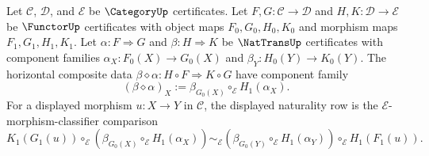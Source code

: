 \begin{definition}
\label{def:nattrans-horizontal-composition-certificate-data}
Let $\mathcal C$, $\mathcal D$, and $\mathcal E$ be $\CategoryUp$ certificates. Let $F,G:\mathcal C\to\mathcal D$ and $H,K:\mathcal D\to\mathcal E$ be $\FunctorUp$ certificates with object maps $F_0,G_0,H_0,K_0$ and morphism maps $F_1,G_1,H_1,K_1$. Let $\alpha:F\Rightarrow G$ and $\beta:H\Rightarrow K$ be $\NatTransUp$ certificates with component families $\alpha_X:F_0(X)\to G_0(X)$ and $\beta_Y:H_0(Y)\to K_0(Y)$. The horizontal composite data $\beta\diamond\alpha:H\circ F\Rightarrow K\circ G$ have component family
$$
(\beta\diamond\alpha)_X:=\beta_{G_0(X)}\circ_{\mathcal E}H_1(\alpha_X).
$$
For a displayed morphism $u:X\to Y$ in $\mathcal C$, the displayed naturality row is the $\mathcal E$-morphism-classifier comparison
$$
K_1(G_1(u))\circ_{\mathcal E}(\beta_{G_0(X)}\circ_{\mathcal E}H_1(\alpha_X))
\sim_{\mathcal E}
(\beta_{G_0(Y)}\circ_{\mathcal E}H_1(\alpha_Y))\circ_{\mathcal E}H_1(F_1(u)).
$$
\end{definition}

